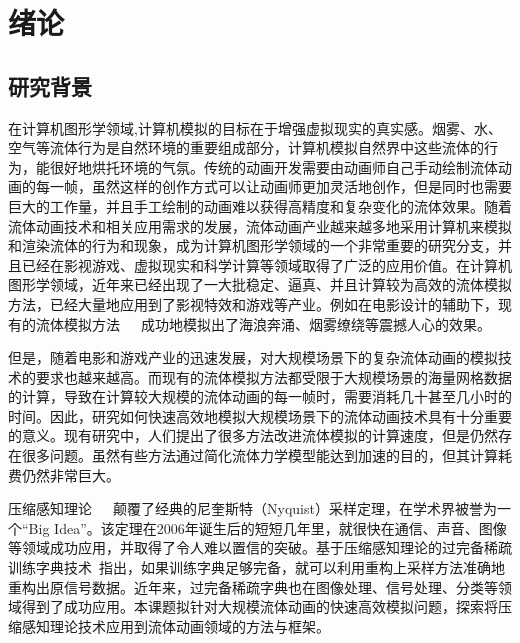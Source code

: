 
\chapter{绪论}
\label{chap:background}

\section{研究背景}

在计算机图形学领域,计算机模拟的目标在于增强虚拟现实的真实感。烟雾、水、空气等流体行为是自然环境的重要组成部分，计算机模拟自然界中这些流体的行为，能很好地烘托环境的气氛。传统的动画开发需要由动画师自己手动绘制流体动画的每一帧，虽然这样的创作方式可以让动画师更加灵活地创作，但是同时也需要巨大的工作量，并且手工绘制的动画难以获得高精度和复杂变化的流体效果。随着流体动画技术和相关应用需求的发展，流体动画产业越来越多地采用计算机来模拟和渲染流体的行为和现象，成为计算机图形学领域的一个非常重要的研究分支，并且已经在影视游戏、虚拟现实和科学计算等领域取得了广泛的应用价值。在计算机图形学领域，近年来已经出现了一大批稳定、逼真、并且计算较为高效的流体模拟方法，已经大量地应用到了影视特效和游戏等产业。例如在电影设计的辅助下，现有的流体模拟方法~\cite{kim2008wavelet}~\cite{losasso2004simulating}~\cite{golas2012large}成功地模拟出了海浪奔涌、烟雾缭绕等震撼人心的效果。

但是，随着电影和游戏产业的迅速发展，对大规模场景下的复杂流体动画的模拟技术的要求也越来越高。而现有的流体模拟方法都受限于大规模场景的海量网格数据的计算，导致在计算较大规模的流体动画的每一帧时，需要消耗几十甚至几小时的时间。因此，研究如何快速高效地模拟大规模场景下的流体动画技术具有十分重要的意义。现有研究中，人们提出了很多方法改进流体模拟的计算速度，但是仍然存在很多问题。虽然有些方法通过简化流体力学模型能达到加速的目的，但其计算耗费仍然非常巨大。

压缩感知理论~\cite{donoho2006compressed}~\cite{candes2006near}~\cite{candes2008introduction}颠覆了经典的尼奎斯特（Nyquist）采样定理，在学术界被誉为一个“Big Idea”。该定理在2006年诞生后的短短几年里，就很快在通信、声音、图像等领域成功应用，并取得了令人难以置信的突破。基于压缩感知理论的过完备稀疏训练字典技术~\cite{yang2012coupled}指出，如果训练字典足够完备，就可以利用重构上采样方法准确地重构出原信号数据。近年来，过完备稀疏字典也在图像处理、信号处理、分类等领域得到了成功应用。本课题拟针对大规模流体动画的快速高效模拟问题，探索将压缩感知理论技术应用到流体动画领域的方法与框架。

